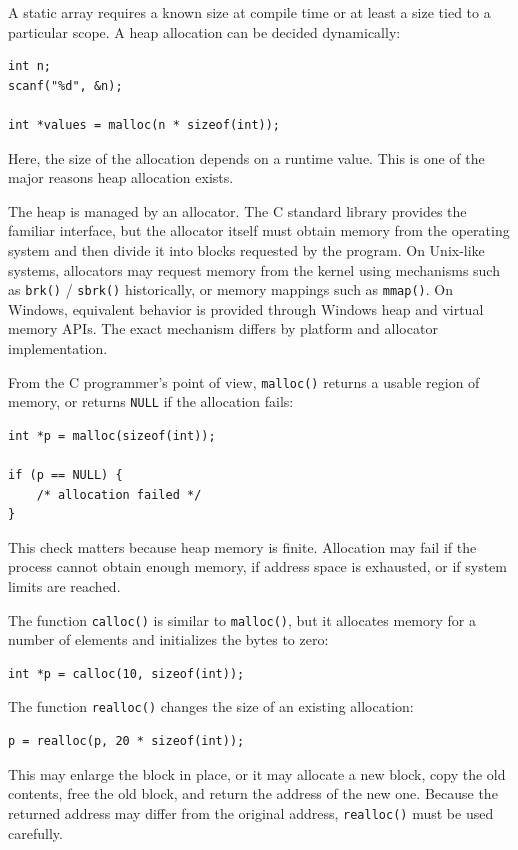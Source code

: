 A static array requires a known size at compile time or at least a size tied to a particular scope. A heap allocation can be decided dynamically:

\begin{verbatim}
int n;
scanf("%d", &n);

int *values = malloc(n * sizeof(int));
\end{verbatim}

Here, the size of the allocation depends on a runtime value. This is one of the major reasons heap allocation exists.

The heap is managed by an allocator. The C standard library provides the familiar interface, but the allocator itself must obtain memory from the operating system and then divide it into blocks requested by the program. On Unix-like systems, allocators may request memory from the kernel using mechanisms such as \texttt{brk()} / \texttt{sbrk()} historically, or memory mappings such as \texttt{mmap()}. On Windows, equivalent behavior is provided through Windows heap and virtual memory APIs. The exact mechanism differs by platform and allocator implementation.

From the C programmer's point of view, \texttt{malloc()} returns a usable region of memory, or returns \texttt{NULL} if the allocation fails:

\begin{verbatim}
int *p = malloc(sizeof(int));

if (p == NULL) {
    /* allocation failed */
}
\end{verbatim}

This check matters because heap memory is finite. Allocation may fail if the process cannot obtain enough memory, if address space is exhausted, or if system limits are reached.

The function \texttt{calloc()} is similar to \texttt{malloc()}, but it allocates memory for a number of elements and initializes the bytes to zero:

\begin{verbatim}
int *p = calloc(10, sizeof(int));
\end{verbatim}

The function \texttt{realloc()} changes the size of an existing allocation:

\begin{verbatim}
p = realloc(p, 20 * sizeof(int));
\end{verbatim}

This may enlarge the block in place, or it may allocate a new block, copy the old contents, free the old block, and return the address of the new one. Because the returned address may differ from the original address, \texttt{realloc()} must be used carefully.

